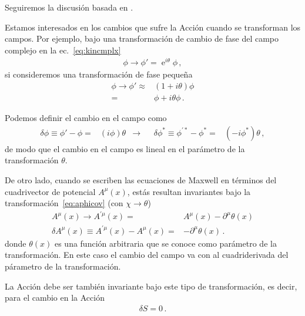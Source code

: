 Seguiremos la discusión basada en \cite{Brading:2000hc,Brading:2003nv,Sundermeyer:2014kha}.

\begin{frame}
Estamos interesados en los cambios que sufre la Acción cuando se transforman los campos. Por ejemplo, bajo una transformación de cambio de fase del campo complejo en la ec.~\eqref{eq:kincmplx}
\begin{align}
  \label{eq:phchg}
  \phi \to \phi'=\operatorname{e}^{i \theta}\phi\,,
\end{align}
si consideremos una transformación de fase pequeña
\begin{align}
  \phi \to \phi'\approx& (1+i\theta)\phi \nonumber\\
                      =&  \phi+i\theta\phi\,.
\end{align} 

Podemos definir el cambio en el campo como
\begin{align}
  \label{eq:deltamatter}
  \delta \phi\equiv \phi'-\phi=&(i\phi) \theta &\to&  & \delta \phi^{*}\equiv \phi^{\prime *}-\phi^*=&(-i\phi^{*}) \theta \,,
\end{align}
de modo que el cambio en el campo es lineal en el parámetro de la transformación $\theta$.
\end{frame}

\begin{frame}
De otro lado, cuando se escriben las ecuaciones de Maxwell en términos del cuadrivector de potencial $A^{\mu}(x)$,      estás resultan invariantes bajo la transformación~\eqref{eq:aphicov} (con $\chi\to\theta$)
\begin{align}
  \label{eq:deltarad}
  A^{\mu}(x)\to A^{\prime\mu}(x)= &  A^{\mu}(x) -\partial^{\mu} \theta(x) \nonumber\\
    \delta A^{\mu}(x)\equiv A^{\prime\mu}(x) -A^{\mu}(x)=& -\partial^{\mu} \theta(x)\,.
\end{align}
donde $\theta(x)$ es una función arbitraria que se conoce como parámetro de la transformación. En este caso el cambio del campo va con al cuadriderivada del párametro de la transformación.

La Acción  debe ser también invariante bajo este tipo de transformación, es decir, para el cambio en la Acción
\begin{align}
  \delta S=0\,.
\end{align}
\end{frame}

